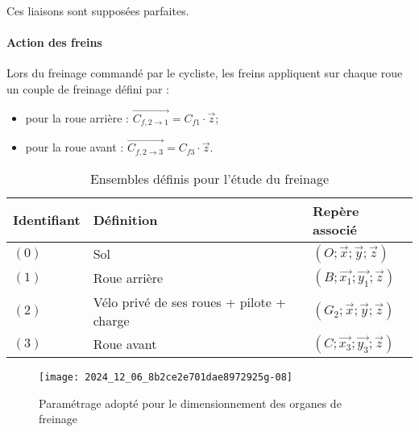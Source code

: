 Ces liaisons sont supposées parfaites.

\paragraph*{Action des freins} Lors du freinage commandé par le cycliste, les freins appliquent sur chaque roue un couple de freinage défini par :
\begin{itemize}
\item pour la roue arrière : \(\overrightarrow{C_{f, 2 \rightarrow 1}}=C_{f 1} \cdot \vec{z}\);
\item pour la roue avant : \(\overrightarrow{C_{f, 2 \rightarrow 3}}=C_{f 3} \cdot \vec{z}\).
\end{itemize}


\begin{table}[!h]
\centering
\begin{tabular}{lll}
Identifiant & Définition & Repère associé \\
\hline
\((0)\) & Sol & \((O ; \vec{x} ; \vec{y} ; \vec{z})\) \\
\((1)\) & Roue arrière & \(\left(B ; \overrightarrow{x_{1}} ; \overrightarrow{y_{1}} ; \vec{z}\right)\) \\
\((2)\) & Vélo privé de ses roues + pilote + charge & \(\left(G_{2} ; \vec{x} ; \vec{y} ; \vec{z}\right)\) \\
\((3)\) & Roue avant & \(\left(C ; \overrightarrow{x_{3}} ; \overrightarrow{y_{3}} ; \vec{z}\right)\) \\
\hline
\end{tabular}
\caption{Ensembles définis pour l'étude du freinage \label{tab_31}}
\end{table}




\begin{figure}[!htb]
\begin{center}
\texttt{[image: 2024\_12\_06\_8b2ce2e701dae8972925g-08]}
\caption{Paramétrage adopté pour le dimensionnement des organes de freinage \label{fig_32}}
\end{center}
\end{figure}



